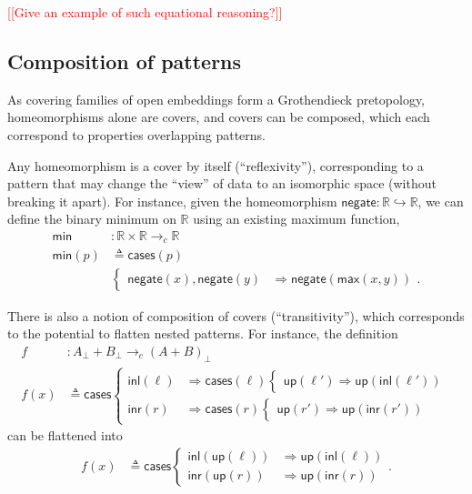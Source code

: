 \documentclass[conference]{IEEEtran}
\newcommand{\hookto}{\hookrightarrow}
\newcommand{\cto}{\to_c}
\newcommand{\R}{\mathbb{R}}
\newcommand{\negate}{\mathsf{negate}}
\newcommand{\Branch}{\Rightarrow}
\newcommand{\up}{\mathsf{up}}
\newcommand{\note}[1]{\textcolor{red}{[[{#1}]]}}
\begin{document}
\note{Give an example of such equational reasoning?}


\subsection{Composition of patterns}

As covering families of open embeddings form a Grothendieck pretopology, homeomorphisms alone are covers, and covers can be composed, which each correspond to properties overlapping patterns.

Any homeomorphism is a cover by itself (``reflexivity''), corresponding to a pattern that may change the ``view'' of data to an isomorphic space (without breaking it apart). For instance, given the homeomorphism $\negate : \R \hookto \R$, we can define the binary minimum on $\R$ using an existing maximum function,
\begin{align*}
\mathsf{min} &: \R \times \R \cto \R
\\ \mathsf{min}(p) &\triangleq \mathsf{cases}(p)
\\ &\begin{cases}
\negate(x), \negate(y) &\Branch \negate(\mathsf{max}(x, y))
\end{cases}.
\end{align*}

There is also a notion of composition of covers (``transitivity''), which corresponds to the potential to flatten nested patterns. For instance, the definition
\begin{align*}
f &: A_\bot + B_\bot \cto \left(A + B\right)_\bot
\\ f(x) &\triangleq \mathsf{cases}
\begin{cases}
\mathsf{inl}(\ell) &\Branch \mathsf{cases}(\ell)
  \begin{cases}
  \up(\ell') \Branch \up(\mathsf{inl}(\ell'))
  \end{cases}
\\
\mathsf{inr}(r) &\Branch \mathsf{cases}(r)
  \begin{cases}
  \up(r') \Branch \up(\mathsf{inr}(r'))
  \end{cases}
\end{cases}
\end{align*}
can be flattened into
\begin{align*}
f(x) &\triangleq \mathsf{cases}
\begin{cases}
\mathsf{inl}(\up(\ell)) &\Branch \up(\mathsf{inl}(\ell))
\\
\mathsf{inr}(\up(r)) &\Branch \up(\mathsf{inr}(r))
\end{cases}.
\end{align*}
\end{document}
